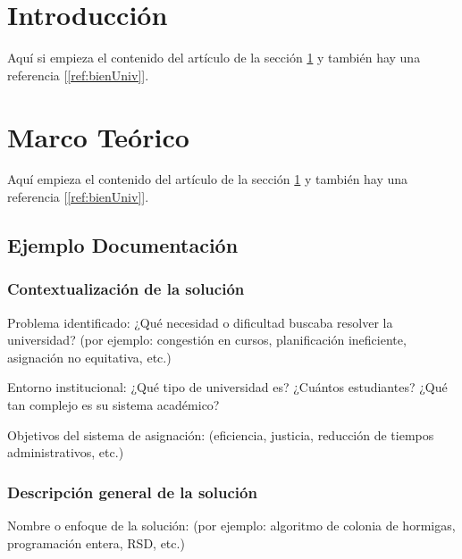 \documentclass{article}
\begin{document}

\section{Introducción}\label{sec:intr}
Aquí si empieza el contenido del artículo de la sección \ref{sec:intr} y también hay una referencia [\ref{ref:bienUniv}].


\section{Marco Teórico}\label{sec:marc}
Aquí empieza el contenido del artículo de la sección \ref{sec:intr} y también hay una referencia [\ref{ref:bienUniv}].

\subsection{Ejemplo Documentación}

\subsubsection{Contextualización de la solución}

Problema identificado: ¿Qué necesidad o dificultad buscaba resolver la universidad? (por ejemplo: congestión en cursos, planificación ineficiente, asignación no equitativa, etc.)

Entorno institucional: ¿Qué tipo de universidad es? ¿Cuántos estudiantes? ¿Qué tan complejo es su sistema académico?

Objetivos del sistema de asignación: (eficiencia, justicia, reducción de tiempos administrativos, etc.)

\subsubsection{Descripción general de la solución}
Nombre o enfoque de la solución: (por ejemplo: algoritmo de colonia de hormigas, programación entera, RSD, etc.)
\end{document}

